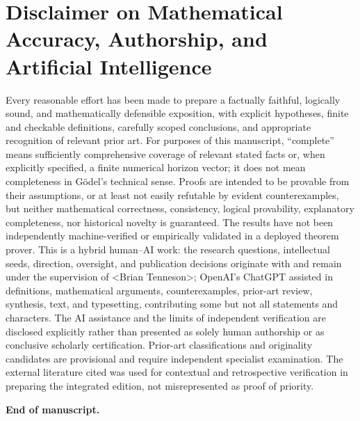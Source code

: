 \documentclass[11pt,letterpaper]{article}
\theoremstyle{definition}
\theoremstyle{remark}
\newcommand{\bn}{\textless{}Brian Tenneson\textgreater{}}
\begin{document}
\section*{Disclaimer on Mathematical Accuracy, Authorship, and Artificial Intelligence}
Every reasonable effort has been made to prepare a factually faithful, logically sound, and mathematically defensible exposition, with explicit hypotheses, finite and checkable definitions, carefully scoped conclusions, and appropriate recognition of relevant prior art. For purposes of this manuscript, ``complete'' means sufficiently comprehensive coverage of relevant stated facts or, when explicitly specified, a finite numerical horizon vector; it does not mean completeness in G\"odel's technical sense. Proofs are intended to be provable from their assumptions, or at least not easily refutable by evident counterexamples, but neither mathematical correctness, consistency, logical provability, explanatory completeness, nor historical novelty is guaranteed. The results have not been independently machine-verified or empirically validated in a deployed theorem prover. This is a hybrid human--AI work: the research questions, intellectual seeds, direction, oversight, and publication decisions originate with and remain under the supervision of \bn; OpenAI's ChatGPT assisted in definitions, mathematical arguments, counterexamples, prior-art review, synthesis, text, and typesetting, contributing some but not all statements and characters. The AI assistance and the limits of independent verification are disclosed explicitly rather than presented as solely human authorship or as conclusive scholarly certification. Prior-art classifications and originality candidates are provisional and require independent specialist examination. The external literature cited was used for contextual and retrospective verification in preparing the integrated edition, not misrepresented as proof of priority.\par
\vspace{1.0em}
\noindent\textbf{End of manuscript.}
\end{document}
